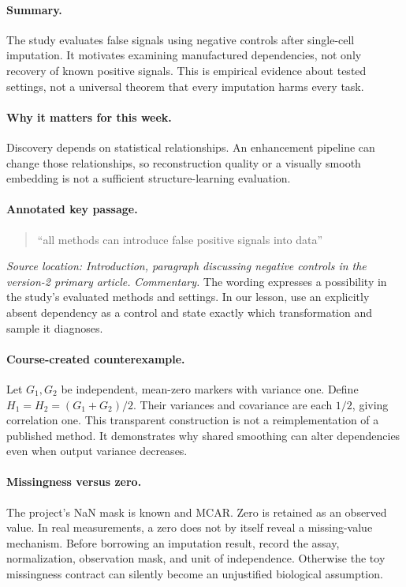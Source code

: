 \documentclass[11pt]{scrartcl}
\begin{document}
\paragraph{Summary.} The study evaluates false signals using negative controls
after single-cell imputation. It motivates examining manufactured dependencies,
not only recovery of known positive signals. This is empirical evidence about
tested settings, not a universal theorem that every imputation harms every task.

\paragraph{Why it matters for this week.} Discovery depends on statistical relationships.
An enhancement pipeline can change those relationships, so reconstruction quality
or a visually smooth embedding is not a sufficient structure-learning evaluation.

\paragraph{Annotated key passage.}
\begin{quote}
``all methods can introduce false positive signals into data''
\end{quote}
\emph{Source location: Introduction, paragraph discussing negative controls in the
version-2 primary article.}
\emph{Commentary.} The wording expresses a possibility in the study's evaluated
methods and settings. In our lesson, use an explicitly absent dependency as a control
and state exactly which transformation and sample it diagnoses.

\paragraph{Course-created counterexample.} Let $G_1,G_2$ be independent, mean-zero
markers with variance one. Define $H_1=H_2=(G_1+G_2)/2$. Their variances and covariance
are each $1/2$, giving correlation one. This transparent construction is not a
reimplementation of a published method. It demonstrates why shared smoothing can
alter dependencies even when output variance decreases.

\paragraph{Missingness versus zero.} The project's NaN mask is known and MCAR.
Zero is retained as an observed value. In real measurements, a zero does not by itself
reveal a missing-value mechanism. Before borrowing an imputation result, record the
assay, normalization, observation mask, and unit of independence. Otherwise the toy
missingness contract can silently become an unjustified biological assumption.
\end{document}
